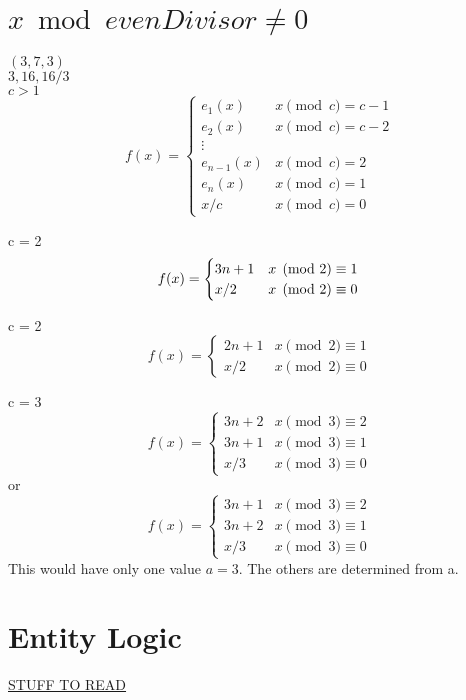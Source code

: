 \documentclass[12pt]{article}
\begin{document}
    \newpage
    \section{$x \bmod evenDivisor \neq 0$}
    $(3, 7, 3)$ \\
    $3, 16, 16 / 3$ \\

    $c > 1$ \\
    \[
        f(x) = 
    \begin{cases}
        e_1(x) & x \pmod c = c - 1 \\
        e_2(x) & x \pmod c = c - 2 \\
        \vdots \\
        e_{n-1}(x) & x \pmod c = 2 \\
        e_n(x) & x \pmod c = 1 \\
        x / c & x \pmod c = 0
    \end{cases}
    \]

    c = 2 \\
    \[
        f(x) = 
    \begin{cases}
        3n + 1 & x \pmod 2 \equiv 1 \\
        x / 2 & x \pmod 2 \equiv 0
    \end{cases} \\
    \]

    c = 2
    \[
        f(x) =
        \begin{cases}
            2n + 1 & x \pmod 2 \equiv 1 \\
            x / 2 & x \pmod 2 \equiv 0
        \end{cases}
    \]

    c = 3
    \[
        f(x) = 
        \begin{cases}
            3n + 2 & x \pmod 3 \equiv 2 \\
            3n + 1 & x \pmod 3 \equiv 1 \\
            x / 3 & x \pmod 3 \equiv 0
        \end{cases}
    \]
    or
    \[
        f(x) = 
        \begin{cases}
            3n + 1 & x \pmod 3 \equiv 2 \\
            3n + 2 & x \pmod 3 \equiv 1 \\
            x / 3 & x \pmod 3 \equiv 0
        \end{cases}
    \]
    This would have only one value $a = 3$. The others are determined from a. 
    \section{Entity Logic}
    \href{https://en.wikipedia.org/wiki/Second-order_logic}{STUFF TO READ}
\end{document}
